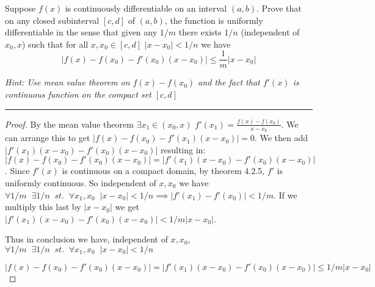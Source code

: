 \documentclass[11pt]{article}
\renewcommand{\sp}{\; \;}
\begin{document}

Suppose $f(x)$ is continuously differentiable on an interval $(a,b)$. Prove that on any closed subinterval $[c,d]$ of $(a,b)$, the function is uniformly differentiable in the sense that given any $1/m$ there exists $1/n$ (independent of $x_0, x$) such that for all $x, x_0 \in [c,d]$ $|x - x_0| < 1/n$ we have
$$|f(x) - f(x_0) - f'(x_0)(x-x_0)| \leq \frac{1}{m} |x - x_0|$$

\textit{Hint: Use mean value theorem on $f(x) - f(x_0)$ and the fact that $f'(x)$ is continuous function on the compact set $[c,d]$}

\hrule

\begin{proof}
 
By the mean value theorem $\exists x_1 \in (x_0, x)$ $f'(x_1) = \frac{f(x) - f(x_0)}{x - x_0}$. 
We can arrange this to get $|f(x) - f(x_0) - f'(x_1)(x - x_0)| = 0$. 
We then add $|f'(x_1)(x - x_0) - f'(x_0)(x - x_0)|$ resulting in: $|f(x) - f(x_0) - f'(x_0)(x - x_0)| = |f'(x_1)(x - x_0) - f'(x_0)(x - x_0)|$.
Since $f'(x)$ is continuous on a compact domain, by theorem 4.2.5, $f'$ is uniformly continuous. So independent of $x, x_0$ we have $\forall 1/m \sp \exists 1/n \sp st. \sp \forall x_1, x_0 \sp |x - x_0| < 1/n \implies |f'(x_1) - f'(x_0)| < 1/m$. 
If we multiply this last by $|x - x_0|$ we get $|f'(x_1)(x - x_0) - f'(x_0)(x - x_0)| < 1/m |x - x_0|$.

Thus in conclusion we have, independent of $x, x_0$, $\forall 1/m \sp \exists 1/n \sp st. \sp \forall x_1, x_0 \sp |x - x_0| < 1/n$

$$|f(x) - f(x_0) - f'(x_0)(x - x_0)| = |f'(x_1)(x - x_0) - f'(x_0)(x - x_0)| \leq  1/m |x - x_0|$$



\end{proof}
\end{document}
